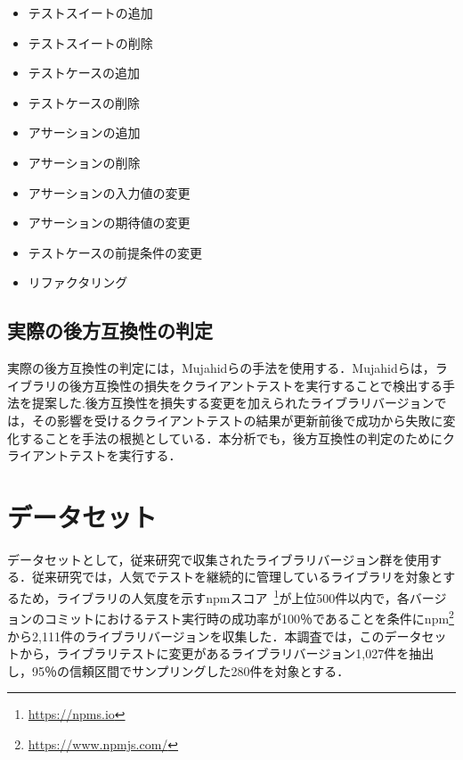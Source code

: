 \documentclass[11pt,dvipdfmx]{jreport}
\begin{document}
\begin{itemize}
  \setlength{\itemsep}{0cm}
  \item テストスイートの追加
  \item テストスイートの削除
  \item テストケースの追加
  \item テストケースの削除
  \item アサーションの追加
  \item アサーションの削除
  \item アサーションの入力値の変更
  \item アサーションの期待値の変更
  \item テストケースの前提条件の変更
  \item リファクタリング
\end{itemize}

\subsection{実際の後方互換性の判定}\label{zissainokouhougokanseinohantei}
実際の後方互換性の判定には，Mujahidらの手法を使用する．Mujahidらは，ライブラリの後方互換性の損失をクライアントテストを実行することで検出する手法を提案した\cite{mujahid}.後方互換性を損失する変更を加えられたライブラリバージョンでは，その影響を受けるクライアントテストの結果が更新前後で成功から失敗に変化することを手法の根拠としている．本分析でも，後方互換性の判定のためにクライアントテストを実行する．

\section{データセット}
データセットとして，従来研究\cite{matsuda}で収集されたライブラリバージョン群を使用する．従来研究では，人気でテストを継続的に管理しているライブラリを対象とするため，ライブラリの人気度を示すnpmスコア~\footnote{\url{https://npms.io}}が上位500件以内で，各バージョンのコミットにおけるテスト実行時の成功率が100％であることを条件にnpm\footnote{\url{https://www.npmjs.com/}}から2,111件のライブラリバージョンを収集した．本調査では，このデータセットから，ライブラリテストに変更があるライブラリバージョン1,027件を抽出し，95％の信頼区間でサンプリングした280件を対象とする．
\end{document}
